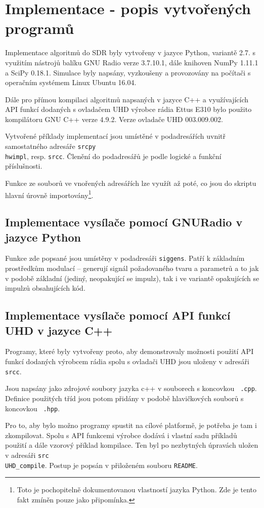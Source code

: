 \section{Implementace - popis vytvořených programů}

Implementace algoritmů do SDR byly vytvořeny v jazyce Python, variantě 2.7. s využitím nástrojů balíku GNU Radio verze 3.7.10.1, dále knihoven NumPy 1.11.1 a SciPy 0.18.1. Simulace byly napsány, vyzkoušeny a provozovány na počítači s operačním systémem Linux Ubuntu 16.04. 

Dále pro přímou kompilaci algoritmů napsaných v jazyce C++ a využívajících API funkcí dodaných s ovladačem UHD výrobce rádia Ettus E310 bylo použito kompilátoru GNU C++ verze 4.9.2. Verze ovladače UHD 003.009.002.

Vytvořené příklady implementací jsou umístěné v podadresářích uvnitř samostatného adresáře \texttt{srcpy\\hwimpl}, resp. \texttt{srcc}. Členění do podadresářů je podle logické a funkční příslušnosti. 

Funkce ze souborů ve vnořených adresářích lze využít až poté, co jsou do skriptu hlavní úrovně importovány\footnote{Toto je pochopitelně dokumentovanou vlastností jazyka Python. Zde je tento fakt zmíněn pouze jako připomínka.}. 

\subsection{Implementace vysílače pomocí GNURadio v jazyce Python}

Funkce zde popsané jsou umístěny v podadresáři \texttt{siggens}. Patří k základním prostředkům modulací -- generují signál požadovaného tvaru a parametrů a to jak v podobě základní (jediný, neopakující se impulz), tak i ve variantě opakujících se impulzů obsahujících kód. 



\subsection{Implementace vysílače pomocí API funkcí UHD v jazyce C++}

Programy, které byly vytvořeny proto, aby demonstrovaly možnosti použití API funkcí dodaných výrobcem rádia spolu s ovladači UHD jsou uloženy v adresáři \texttt{srcc}.

Jsou napsány jako zdrojové soubory jazyka c++ v souborech s koncovkou \texttt{ .cpp}. Definice použitých tříd jsou potom přidány v podobě hlavičkových souborů s koncovkou \texttt{ .hpp}.

Pro to, aby bylo možno programy spustit na cílové platformě, je potřeba je tam i zkompilovat. Spolu s API funkcemi výrobce dodává i vlastní sadu příkladů použití a dále vzorový příklad kompilace. Ten byl po nezbytných úpravách uložen v adresáři \texttt{src\\UHD\_compile}. Postup je popsán v přiloženém souboru \texttt{README}.


